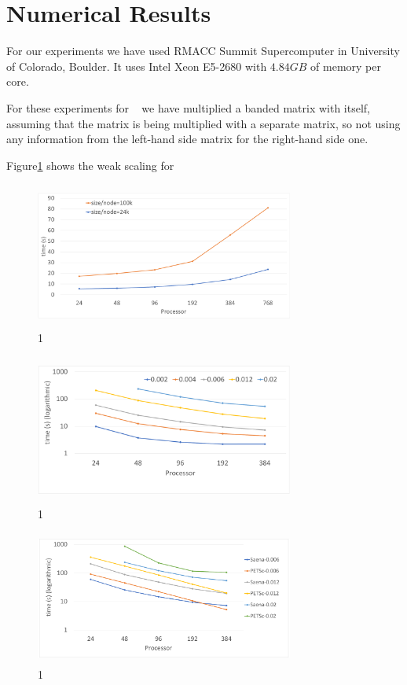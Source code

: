 \section{Numerical Results}
\label{sec:results}

For our experiments we have used RMACC Summit Supercomputer in University of Colorado, Boulder. It uses Intel Xeon E5-2680 with $4.84GB$ of memory per core.

For these experiments for \mm~ we have multiplied a banded matrix with itself, assuming that the matrix is being multiplied with a separate matrix, so not using any information from the left-hand side matrix for the right-hand side one.

Figure\ref{fig:weak1} shows the weak scaling for 

\begin{figure}[tbh]
 \centering
 \includegraphics[width=8.5cm,height=4.8cm]{./figures/weak1.pdf}
 \caption{1}
 \label{fig:weak1}
\end{figure}

\begin{figure}[tbh]
 \centering
 \includegraphics[width=8.5cm,height=4.9cm]{./figures/strong1.pdf}
 \caption{1}
 \label{fig:strong1}
\end{figure}

\begin{figure}[tbh]
 \centering
 \includegraphics[width=8.5cm,height=4.4cm]{./figures/petsc1.pdf}
 \caption{1}
 \label{fig:petsc1}
\end{figure}

